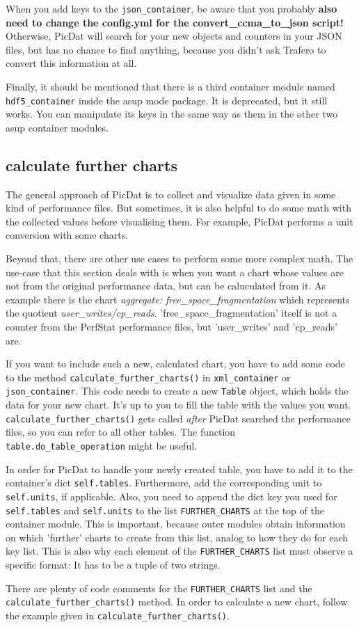 \documentclass[a4paper,11pt]{article}
\begin{document}
When you add keys to the \verb|json_container|, be aware that you probably \textbf{also need to change the config.yml for the convert\_ccma\_to\_json script!} Otherwise, PicDat will search for your new objects and counters in your JSON files, but has no chance to find anything, because you didn't ask Trafero to convert this information at all.
\bigskip

Finally, it should be mentioned that there is a third container module named \verb|hdf5_container| inside the asup mode package. It is deprecated, but it still works. You can manipulate its keys in the same way as them in the other two asup container modules.

\subsection*{calculate further charts}
The general approach of PicDat is to collect and visualize data given in some kind of performance files. But sometimes, it is also helpful to do some math with the collected values before visualising them. For example, PicDat performs a unit conversion with some charts.

Beyond that, there are other use cases to perform some more complex math. The use-case that this section deals with is when you want a chart whose values are not from the original performance data, but can be caluculated from it. As example there is the chart \textit{aggregate: free\_space\_fragmentation} which represents the quotient \textit{user\_writes/cp\_reads}. 'free\_space\_fragmentation' itself is not a counter from the PerfStat performance files, but 'user\_writes' and 'cp\_reads' are.
\bigskip

If you want to include such a new, calculated chart, you have to add some code to the method \verb|calculate_further_charts()| in \verb|xml_container| or \verb|json_container|. This code needs to create a new \verb|Table| object, which holds the data for your new chart. It's up to you to fill the table with the values you want. \verb|calculate_further_charts()| gets called \textit{after} PicDat searched the performance files, so you can refer to all other tables. The function \verb|table.do_table_operation| might be useful.

In order for PicDat to handle your newly created table, you have to add it to the container's dict \verb|self.tables|. Furthermore, add the corresponding unit to \verb|self.units|, if applicable. Also, you need to append the dict key you used for \verb|self.tables| and \verb|self.units| to the list \verb|FURTHER_CHARTS| at the top of the container module. This is important, because outer modules obtain information on which 'further' charts to create from this list, analog to how they do for each key list. This is also why each element of the \verb|FURTHER_CHARTS| list must observe a specific format: It has to be a tuple of two strings.
\bigskip

There are plenty of code comments for the \verb|FURTHER_CHARTS| list and the \verb|calculate_further_|\break\verb|charts()| method. In order to calculate a new chart, follow the example given in \verb|calculate_further_|\break\verb|charts()|.
\end{document}
